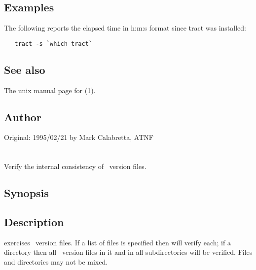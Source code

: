 \subsection*{Examples}

The following reports the elapsed time in h:m:s format since tract was
installed:

\begin{verbatim}
   tract -s `which tract`
\end{verbatim}

\subsection*{See also}

The unix manual page for (1).

\subsection*{Author}

Original: 1995/02/21 by Mark Calabretta, ATNF


\newpage
\section{}
\label{xrcs}

Verify the internal consistency of \rcs\ version files.

\subsection*{Synopsis}

\begin{synopsis}
\end{synopsis}

\subsection*{Description}

 exercises \rcs\ version files.  If a list of files is specified
then  will verify each; if a directory then all \rcs\ version files
in it and in all subdirectories will be verified.  Files and directories may
not be mixed.

